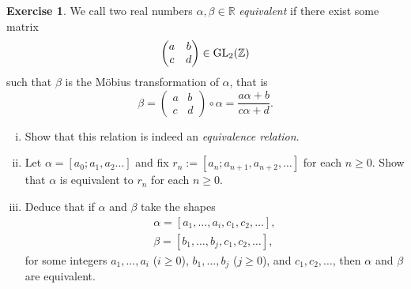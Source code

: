 \documentclass[12pt,a4paper]{article}
\theoremstyle{plain}
\newtheorem*{Sol*}{Solution}
\theoremstyle{definition}
\newtheorem{Ex}{Exercise}
\def \R {\mathbb R}
\def \Z {\mathbb Z}
\newif\ifsolutions
\newcommand{\exercise}[2]{
			\begin{Ex} #1 \end{Ex}
			\ifsolutions  \begin{Sol*} #2 \end{Sol*} \bigskip \else \bigskip  \fi
		}
\begin{document}
\exercise{\label{ex:1}
	We call two real numbers $\alpha, \beta \in \R$ \emph{equivalent} if there exist some matrix
		\[ \begin{pmatrix} a & b \\ c & d \end{pmatrix} \in {\rm GL}_2(\Z) \]
	such that $\beta$ is the Möbius transformation of $\alpha$, that is
		\[ \beta = \begin{pmatrix} a & b \\ c & d \end{pmatrix} \circ α =    \frac{a \alpha + b}{c \alpha + d}. \]
	
	\begin{enumerate}[i)]
		\item Show that this relation is indeed an \emph{equivalence relation}.
		\item Let $\alpha = [a_0;a_1, a_2 \dots]$ and fix $r_n := [a_n; a_{n+1}, a_{n+2}, \dots]$ for each $n \geq 0$.
		Show that $\alpha$ is equivalent to $r_n$ for each $n \geq 0$.

		\item Deduce that if $\alpha$ and $\beta$ take the shapes
			\begin{gather*}
				\alpha = [a_1, \dots, a_i, c_1, c_2, \dots], \\
				\beta = [b_1, \dots, b_j, c_1, c_2, \dots],
			\end{gather*}
		for some integers $a_1, \dots, a_i$ ($i \geq 0$), $b_1, \dots, b_j$ ($j\geq0$), and $c_1, c_2, \dots$,
		then $\alpha$ and $\beta$ are equivalent.
	\end{enumerate}
}
{
	\begin{enumerate}
		\item The identity matrix $I_2$ sends $\alpha$ to itself, showing the reflexivity.
		The inverse integer matrix shows the symmetry.
		The multiplication of the matrices shows transitivity.

		\item It suffices to show that $\alpha$ is equivalent to $r_1$ to conclude.
		Since 
			\[ \alpha = a_0 + \frac{1}{r_1} = \frac{a_0 r_1 + 1}{r_1} = \begin{pmatrix} a_0 & 1 \\ 1 & 0 \end{pmatrix} \circ r_1, \]
		the two are equivalent.

		\item $\alpha$ and $\beta$ are both equivalent to $[c_1, c_2, \dots]$, and hence to each other by transitivity.
	\end{enumerate}
}
\end{document}
